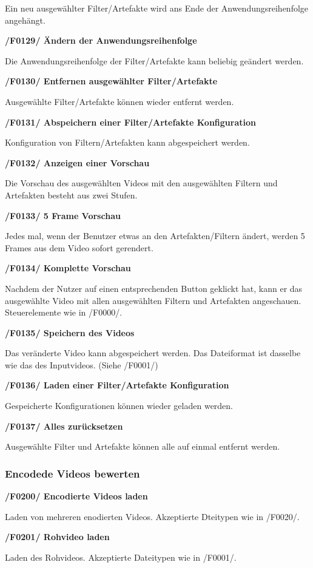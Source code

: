 \documentclass[parskip=full]{scrartcl}
\begin{document}
Ein neu ausgewählter Filter/Artefakte wird ans Ende der Anwendungsreihenfolge angehängt.

\textbf{/F0129/ Ändern der Anwendungsreihenfolge}

Die Anwendungsreihenfolge der Filter/Artefakte kann beliebig geändert werden.

\textbf{/F0130/ Entfernen ausgewählter Filter/Artefakte}

Ausgewählte Filter/Artefakte können wieder entfernt werden.

\textbf{/F0131/ Abspeichern einer Filter/Artefakte Konfiguration}

Konfiguration von Filtern/Artefakten kann abgespeichert werden.

\textbf{/F0132/ Anzeigen einer Vorschau}

Die Vorschau des ausgewählten Videos mit den ausgewählten Filtern und Artefakten besteht aus zwei Stufen.

\textbf{/F0133/ 5 Frame Vorschau}

Jedes mal, wenn der Benutzer etwas an den Artefakten/Filtern ändert, werden 5 Frames aus dem Video sofort gerendert.

\textbf{/F0134/ Komplette Vorschau}

Nachdem der Nutzer auf einen entsprechenden Button geklickt hat, kann er das ausgewählte Video mit allen ausgewählten Filtern und Artefakten angeschauen. Steuerelemente wie in /F0000/.

\textbf{/F0135/ Speichern des Videos}

Das veränderte Video kann abgespeichert werden. Das Dateiformat ist dasselbe wie das des Inputvideos. (Siehe /F0001/)

\textbf{/F0136/ Laden einer Filter/Artefakte Konfiguration}

Gespeicherte Konfigurationen können wieder geladen werden.

\textbf{/F0137/ Alles zurücksetzen}

Ausgewählte Filter und Artefakte können alle auf einmal entfernt werden.
\subsubsection{Encodede Videos bewerten}
\textbf{/F0200/ Encodierte Videos laden}

Laden von mehreren enodierten Videos. Akzeptierte Dteitypen wie in /F0020/.

\textbf{/F0201/ Rohvideo laden}

Laden des Rohvideos. Akzeptierte Dateitypen wie in /F0001/.
\end{document}
